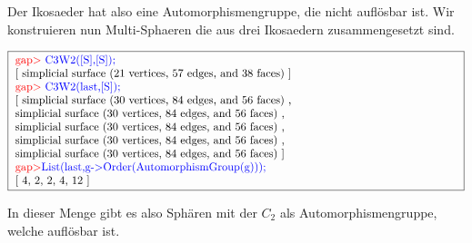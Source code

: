 \documentclass[12pt,titlepage,twoside,cleardoublepage]{article}
\theoremstyle{nummermitklammern}
\numberwithin{equation}{section}
\begin{document}
Der Ikosaeder hat also eine Automorphismengruppe, die nicht auflösbar ist. Wir konstruieren nun Multi-Sphaeren die aus drei Ikosaedern zusammengesetzt sind.
\begin{center}
$\fbox{
\parbox{14cm}{
\textcolor{red}{gap$>$} \textcolor{blue}{C3W2([S],[S]);}\newline
[ simplicial surface (21 vertices, 57 edges, and 38 faces)
 ]\newline
\textcolor{red}{gap$>$} \textcolor{blue}{C3W2(last,[S]);}\newline
[ simplicial surface (30 vertices, 84 edges, and 56 faces)
    ,\newline simplicial surface (30 vertices, 84 edges, and 56 faces)
    , \newline simplicial surface (30 vertices, 84 edges, and 56 faces)
    ,\newline simplicial surface (30 vertices, 84 edges, and 56 faces)
    ,\newline
  simplicial surface (30 vertices, 84 edges, and 56 faces)
 ]\newline
\textcolor{red}{gap$>$}\textcolor{blue}{ List(last,g->Order(AutomorphismGroup(g)));}\newline
[ 4, 2, 2, 4, 12 ]
}}$
\end{center}
In dieser Menge gibt es also Sphären mit der $C_2$ als Automorphismengruppe, welche auflösbar ist.
\end{document}

